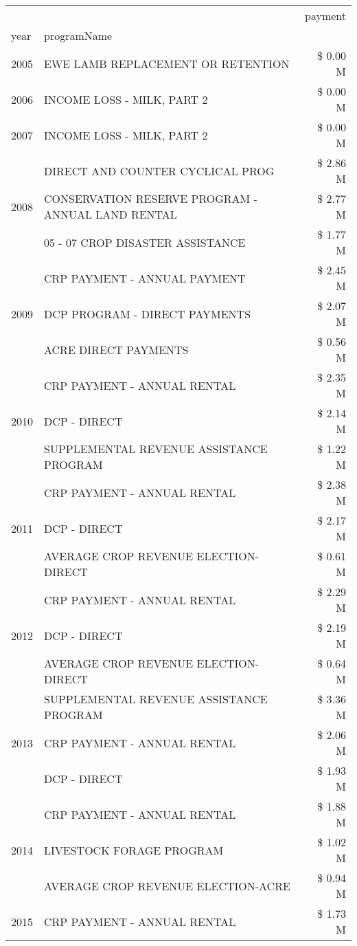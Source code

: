 \begin{tabular}{llr}
\toprule
 &  & payment \\
year & programName &  \\
\midrule
2005 & EWE LAMB REPLACEMENT OR RETENTION & \$ 0.00 M \\
\cline{1-3}
2006 & INCOME LOSS - MILK, PART 2 & \$ 0.00 M \\
\cline{1-3}
2007 & INCOME LOSS - MILK, PART 2 & \$ 0.00 M \\
\cline{1-3}
\multirow[t]{3}{*}{2008} & DIRECT AND COUNTER CYCLICAL PROG & \$ 2.86 M \\
 & CONSERVATION RESERVE PROGRAM - ANNUAL LAND RENTAL & \$ 2.77 M \\
 & 05 - 07 CROP DISASTER ASSISTANCE & \$ 1.77 M \\
\cline{1-3}
\multirow[t]{3}{*}{2009} & CRP PAYMENT - ANNUAL PAYMENT & \$ 2.45 M \\
 & DCP PROGRAM - DIRECT PAYMENTS & \$ 2.07 M \\
 & ACRE DIRECT PAYMENTS & \$ 0.56 M \\
\cline{1-3}
\multirow[t]{3}{*}{2010} & CRP PAYMENT - ANNUAL RENTAL & \$ 2.35 M \\
 & DCP - DIRECT & \$ 2.14 M \\
 & SUPPLEMENTAL REVENUE ASSISTANCE PROGRAM & \$ 1.22 M \\
\cline{1-3}
\multirow[t]{3}{*}{2011} & CRP PAYMENT - ANNUAL RENTAL & \$ 2.38 M \\
 & DCP - DIRECT & \$ 2.17 M \\
 & AVERAGE CROP REVENUE ELECTION-DIRECT & \$ 0.61 M \\
\cline{1-3}
\multirow[t]{3}{*}{2012} & CRP PAYMENT - ANNUAL RENTAL & \$ 2.29 M \\
 & DCP - DIRECT & \$ 2.19 M \\
 & AVERAGE CROP REVENUE ELECTION-DIRECT & \$ 0.64 M \\
\cline{1-3}
\multirow[t]{3}{*}{2013} & SUPPLEMENTAL REVENUE ASSISTANCE PROGRAM & \$ 3.36 M \\
 & CRP PAYMENT - ANNUAL RENTAL & \$ 2.06 M \\
 & DCP - DIRECT & \$ 1.93 M \\
\cline{1-3}
\multirow[t]{3}{*}{2014} & CRP PAYMENT - ANNUAL RENTAL & \$ 1.88 M \\
 & LIVESTOCK FORAGE PROGRAM & \$ 1.02 M \\
 & AVERAGE CROP REVENUE ELECTION-ACRE & \$ 0.94 M \\
\cline{1-3}
\multirow[t]{3}{*}{2015} & CRP PAYMENT - ANNUAL RENTAL & \$ 1.73 M \\

\end{tabular}
